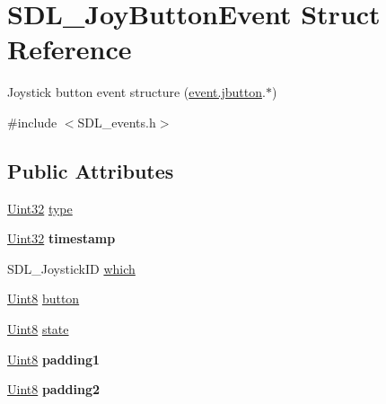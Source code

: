 \hypertarget{struct_s_d_l___joy_button_event}{}\section{S\+D\+L\+\_\+\+Joy\+Button\+Event Struct Reference}
\label{struct_s_d_l___joy_button_event}


Joystick button event structure (\hyperlink{union_s_d_l___event_a591104d64903ae1cf70874fb5d3124ff}{event.\+jbutton}.$\ast$)  




{\ttfamily \#include $<$S\+D\+L\+\_\+events.\+h$>$}

\subsection*{Public Attributes}
\begin{DoxyCompactItemize}
\item 
\hyperlink{_s_d_l__stdinc_8h_add440eff171ea5f55cb00c4a9ab8672d}{Uint32} \hyperlink{struct_s_d_l___joy_button_event_a8f3312a046d37fa2884b93f69c4cb655}{type}
\item 
\hypertarget{struct_s_d_l___joy_button_event_ab50b6f7d1ab3ac53df69fc2d6cf5fa2a}{}\hyperlink{_s_d_l__stdinc_8h_add440eff171ea5f55cb00c4a9ab8672d}{Uint32} {\bfseries timestamp}\label{struct_s_d_l___joy_button_event_ab50b6f7d1ab3ac53df69fc2d6cf5fa2a}

\item 
S\+D\+L\+\_\+\+Joystick\+I\+D \hyperlink{struct_s_d_l___joy_button_event_a1679049adad7242b28420948fdc79044}{which}
\item 
\hyperlink{_s_d_l__stdinc_8h_a2944638813a090aa23e62f4da842c3e2}{Uint8} \hyperlink{struct_s_d_l___joy_button_event_a73ebe4261cf80564052af9c1af737a4d}{button}
\item 
\hyperlink{_s_d_l__stdinc_8h_a2944638813a090aa23e62f4da842c3e2}{Uint8} \hyperlink{struct_s_d_l___joy_button_event_ad3b6f8d9aa2c5e694f664b97d12bcd2b}{state}
\item 
\hypertarget{struct_s_d_l___joy_button_event_a3e7ca473fb7783d755d64598529b1ff9}{}\hyperlink{_s_d_l__stdinc_8h_a2944638813a090aa23e62f4da842c3e2}{Uint8} {\bfseries padding1}\label{struct_s_d_l___joy_button_event_a3e7ca473fb7783d755d64598529b1ff9}

\item 
\hypertarget{struct_s_d_l___joy_button_event_a77a78bee38f4bf0682ccd97bbf8f9ab9}{}\hyperlink{_s_d_l__stdinc_8h_a2944638813a090aa23e62f4da842c3e2}{Uint8} {\bfseries padding2}\label{struct_s_d_l___joy_button_event_a77a78bee38f4bf0682ccd97bbf8f9ab9}

\end{DoxyCompactItemize}


